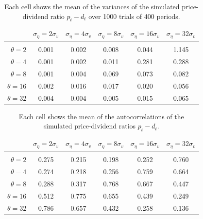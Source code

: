 \documentclass[12pt]{article}
\begin{document}
\begin{table}[h]
    \centering
\begin{tabular}{rccccc}
\hline  
            & \multicolumn{1}{l}{$\sigma_{\eta} =2\sigma_{v}$} & \multicolumn{1}{l}{$\sigma_{\eta} =4\sigma_{v}$} & \multicolumn{1}{l}{$\sigma_{\eta} =8\sigma_{v}$} & \multicolumn{1}{l}{$\sigma_{\eta} =16\sigma_{v}$} & \multicolumn{1}{l}{$\sigma_{\eta} =32\sigma_{v}$} \\ \hline  \vspace{-3mm} \\        
$\theta=2$                     & 0.001 & 0.002 & 0.008 & 0.044  & 1.145  \\ \hline
$\theta=4$                     & 0.001 & 0.002 & 0.011 & 0.281  & 0.288  \\ \hline
$\theta=8$                 & 0.001 & 0.004 & 0.069 & 0.073  & 0.082  \\ \hline
$\theta=16$                 & 0.002 & 0.016 & 0.017 & 0.020  & 0.056  \\ \hline
$\theta=32$                 & 0.004 & 0.004 & 0.005 & 0.015  & 0.065  \\ \hline
\end{tabular}
\caption{Each cell shows the mean of the variances of the simulated price-dividend ratio $p_{t}-d_{t}$ over 1000 trials of 400 periods.}
\label{tabvar}
\end{table}

\begin{table}[h]
    \centering
\begin{tabular}{rccccc}
\hline  
            & \multicolumn{1}{l}{$\sigma_{\eta} =2\sigma_{v}$} & \multicolumn{1}{l}{$\sigma_{\eta} =4\sigma_{v}$} & \multicolumn{1}{l}{$\sigma_{\eta} =8\sigma_{v}$} & \multicolumn{1}{l}{$\sigma_{\eta} =16\sigma_{v}$} & \multicolumn{1}{l}{$\sigma_{\eta} =32\sigma_{v}$} \\ \hline  \vspace{-3mm} \\        
$\theta=2$                     & 0.275 & 0.215 & 0.198 & 0.252  & 0.760  \\ \hline
$\theta=4$                    & 0.274 & 0.218 & 0.256 & 0.759  & 0.664  \\ \hline
$\theta=8$                 & 0.288 & 0.317 & 0.768 & 0.667  & 0.447  \\ \hline
$\theta=16$                & 0.512 & 0.775 & 0.655 & 0.439  & 0.249  \\ \hline
$\theta=32$                 & 0.786 & 0.657 & 0.432 & 0.258  & 0.136  \\ \hline
\end{tabular}
\caption{Each cell shows the mean of the autocorrelations of the simulated price-dividend ratios $p_{t}-d_{t}$.}
\label{tabac}
\end{table}
\end{document}

